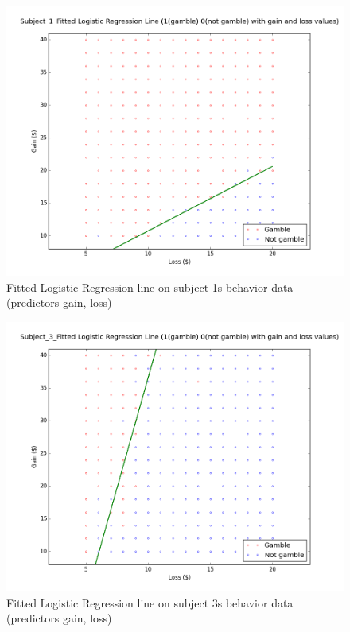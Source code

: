 \begin{figure}[H] 
\centering \includegraphics[scale=0.35]{../fig/log_reg_behav/log_regression_1.png}	 
\caption{Fitted Logistic Regression line on subject 1\’s behavior data (predictors\: gain, loss)}
\end{figure} 

\begin{figure}[H] 
\centering \includegraphics[scale=0.35]{../fig/log_reg_behav/log_regression_3.png}	 
\caption{Fitted Logistic Regression line on subject 3\’s behavior data (predictors\: gain, loss)}
\end{figure} 


